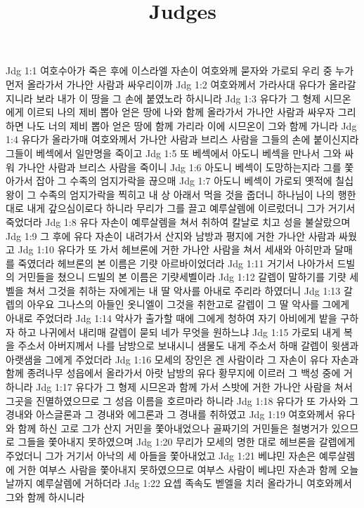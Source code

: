

\title{Judges}

Jdg 1:1  여호수아가 죽은 후에 이스라엘 자손이 여호와께 묻자와 가로되 우리 중 누가 먼저 올라가서 가나안 사람과 싸우리이까
Jdg 1:2  여호와께서 가라사대 유다가 올라갈지니라 보라 내가 이 땅을 그 손에 붙였노라 하시니라
Jdg 1:3  유다가 그 형제 시므온에게 이르되 나의 제비 뽑아 얻은 땅에 나와 함께 올라가서 가나안 사람과 싸우자 그리하면 나도 너의 제비 뽑아 얻은 땅에 함께 가리라 이에 시므온이 그와 함께 가니라
Jdg 1:4  유다가 올라가매 여호와께서 가나안 사람과 브리스 사람을 그들의 손에 붙이신지라 그들이 베섹에서 일만명을 죽이고
Jdg 1:5  또 베섹에서 아도니 베섹을 만나서 그와 싸워 가나안 사람과 브리스 사람을 죽이니
Jdg 1:6  아도니 베섹이 도망하는지라 그를 쫓아가서 잡아 그 수족의 엄지가락을 끊으매
Jdg 1:7  아도니 베섹이 가로되 옛적에 칠십 왕이 그 수족의 엄지가락을 찍히고 내 상 아래서 먹을 것을 줍더니 하나님이 나의 행한 대로 내게 갚으심이로다 하니라 무리가 그를 끌고 예루살렘에 이르렀더니 그가 거기서 죽었더라
Jdg 1:8  유다 자손이 예루살렘을 쳐서 취하여 칼날로 치고 성을 불살랐으며
Jdg 1:9  그 후에 유다 자손이 내려가서 산지와 남방과 평지에 거한 가나안 사람과 싸웠고
Jdg 1:10  유다가 또 가서 헤브론에 거한 가나안 사람을 쳐서 세새와 아히만과 달매를 죽였더라 헤브론의 본 이름은 기럇 아르바이었더라
Jdg 1:11  거기서 나아가서 드빌의 거민들을 쳤으니 드빌의 본 이름은 기럇세벨이라
Jdg 1:12  갈렙이 말하기를 기럇 세벨을 쳐서 그것을 취하는 자에게는 내 딸 악사를 아내로 주리라 하였더니
Jdg 1:13  갈렙의 아우요 그나스의 아들인 옷니엘이 그것을 취한고로 갈렙이 그 딸 악사를 그에게 아내로 주었더라
Jdg 1:14  악사가 출가할 때에 그에게 청하여 자기 아비에게 밭을 구하자 하고 나귀에서 내리매 갈렙이 묻되 네가 무엇을 원하느냐
Jdg 1:15  가로되 내게 복을 주소서 아버지께서 나를 남방으로 보내시니 샘물도 내게 주소서 하매 갈렙이 윗샘과 아랫샘을 그에게 주었더라
Jdg 1:16  모세의 장인은 겐 사람이라 그 자손이 유다 자손과 함께 종려나무 성읍에서 올라가서 아랏 남방의 유다 황무지에 이르러 그 백성 중에 거하니라
Jdg 1:17  유다가 그 형제 시므온과 함께 가서 스밧에 거한 가나안 사람을 쳐서 그곳을 진멸하였으므로 그 성읍 이름을 호르마라 하니라
Jdg 1:18  유다가 또 가사와 그 경내와 아스글론과 그 경내와 에그론과 그 경내를 취하였고
Jdg 1:19  여호와께서 유다와 함께 하신 고로 그가 산지 거민을 쫓아내었으나 골짜기의 거민들은 철병거가 있으므로 그들을 쫓아내지 못하였으며
Jdg 1:20  무리가 모세의 명한 대로 헤브론을 갈렙에게 주었더니 그가 거기서 아낙의 세 아들을 쫓아내었고
Jdg 1:21  베냐민 자손은 예루살렘에 거한 여부스 사람을 쫓아내지 못하였으므로 여부스 사람이 베냐민 자손과 함께 오늘날까지 예루살렘에 거하더라
Jdg 1:22  요셉 족속도 벧엘을 치러 올라가니 여호와께서 그와 함께 하시니라
